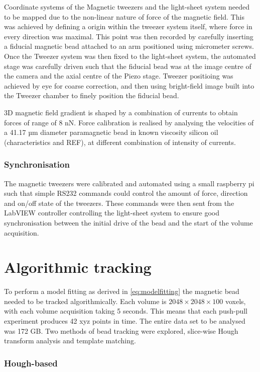 Coordinate systems of the Magnetic tweezers and the light-sheet system needed to be mapped due to the non-linear nature of force of the magnetic field.
This was achieved by defining a origin within the tweezer system itself, where force in every direction was maximal.
This point was then recorded by carefully inserting a fiducial magnetic bead attached to an arm positioned using micrometer screws.
Once the Tweezer system was then fixed to the light-sheet system, the automated stage was carefully driven such that the fiducial bead was at the image centre of the camera and the axial centre of the Piezo stage.
Tweezer positioing was achieved by eye for coarse correction, and then using bright-field image built into the Tweezer chamber to finely position the fiducial bead.

3D magnetic field gradient is shaped by a combination of currents to obtain forces of range of 8 nN. Force calibration is realised by analysing the velocities of a 41.17 µm diameter paramagnetic bead in known viscosity silicon oil (characteristics and REF), at different combination of intensity of currents.

\subsubsection{Synchronisation}
The magnetic tweezers were calibrated and automated using a small raspberry pi such that simple RS232 commands could control the amount of force, direction and on/off state of the tweezers.
These commands were then sent from the LabVIEW controller controlling the light-sheet system to ensure good synchronisation between the initial drive of the bead and the start of the volume acquisition.

\section{Algorithmic tracking}

To perform a model fitting as derived in \eqref{eq:modelfitting} the magnetic bead needed to be tracked algorithmically.
Each volume is $2048 \times 2048 \times 100$ voxels, with each volume acquisition taking 5 seconds.
This means that each push-pull experiment produces 42 xyz points in time.
The entire data set to be analysed was 172 GB.
Two methods of bead tracking were explored, slice-wise Hough transform analysis and template matching.

\subsubsection{Hough-based}

